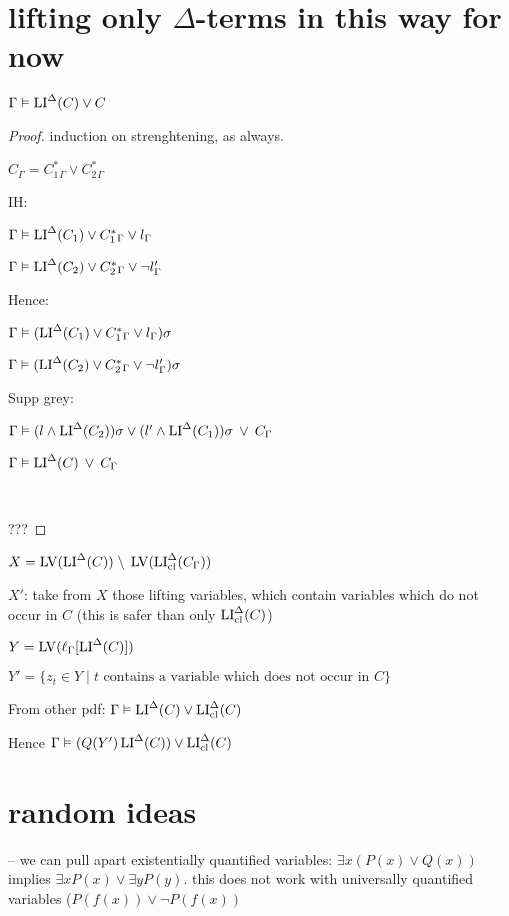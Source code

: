 \documentclass[,%
	draft=false,%
	numbers=noendperiod
	11pt,
	a4paper,
	oneside,%
	openany,
]{memoir}
\begin{document}
\section{lifting only $\Delta$-terms in this way for now}

\begin{clemma}
	$\Gamma \vDash \operatorname{LI}^\Delta(C) \lor C$
\end{clemma}
\begin{proof}
	induction on strenghtening, as always.

	$C_\Gamma = 
	C_1^*{}_\Gamma \lor
	C_2^*{}_\Gamma$

	IH:

	$\Gamma \vDash \operatorname{LI}^\Delta(C_1) \lor C_1^*{}_\Gamma \lor l_\Gamma$

	$\Gamma \vDash \operatorname{LI}^\Delta(C_2) \lor C_2^*{}_\Gamma \lor \lnot l'_\Gamma$

	Hence:

	$\Gamma \vDash ( \operatorname{LI}^\Delta(C_1) \lor C_1^*{}_\Gamma \lor l_\Gamma )\sigma$

	$\Gamma \vDash ( \operatorname{LI}^\Delta(C_2) \lor C_2^*{}_\Gamma \lor \lnot l'_\Gamma )\sigma$

	Supp grey:

	$\Gamma \vDash 
	(l \land \operatorname{LI}^\Delta(C_2))\sigma \lor (l' \land \operatorname{LI}^\Delta(C_1))\sigma
	\;\,{\lor}\;\, C_\Gamma $

	$\Gamma \vDash  \operatorname{LI}^\Delta(C) \;\,{\lor}\;\, C_\Gamma $

	~


	???

\end{proof}

$X = \operatorname{LV}(\operatorname{LI}^\Delta(C)) \;{\setminus}\; \operatorname{LV}(\operatorname{LI}_{\operatorname{cl}}^\Delta(C_\Gamma))$

$X'$: take from $X$ those lifting variables, which contain variables which do not occur in $C$ (this is safer than only $\operatorname{LI}_{\operatorname{cl}}^\Delta(C)$)

$Y = \operatorname{LV}( \ell_{\Gamma}[\operatorname{LI}^\Delta(C)])$

$Y' = \{ z_t \in Y \mid t\text{ contains a variable which does not occur in $C$} \}$

From other pdf: $\Gamma \vDash \operatorname{LI}^\Delta(C) \lor \operatorname{LI}_{\operatorname{cl}}^\Delta(C)$

Hence $\Gamma \vDash (Q(Y') \operatorname{LI}^\Delta(C)) \lor \operatorname{LI}_{\operatorname{cl}}^\Delta(C)$


\section{random ideas}

-- we can pull apart existentially quantified variables: $\exists x (P(x) \lor Q(x))$ implies $\exists x P(x) \lor \exists y P(y)$. this does not work with universally quantified variables ($P(f(x)) \lor \lnot P(f(x))$
\end{document}
